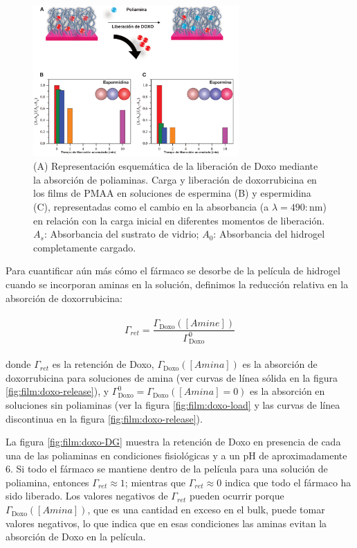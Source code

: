 \begin{figure}[!ht]
	\centering
	\includegraphics[width=0.7\textwidth]{Figures/graph-film/fig11.pdf}
	\caption{(A) Representaci\'on esquem\'atica de la liberaci\'on de Doxo mediante la absorci\'on de poliaminas. Carga y liberaci\'on de doxorrubicina en los films de PMAA en soluciones de espermina (B) y espermidina (C), representadas como el cambio en la absorbancia (a $\lambda=490:$nm) en relaci\'on con la carga inicial en diferentes momentos de liberaci\'on. $A_s$: Absorbancia del sustrato de vidrio; $A_0$: Absorbancia del hidrogel completamente cargado.}
	\label{fig:film:exp_doxo-amines}
\end{figure}

Para cuantificar a\'un m\'as c\'omo el f\'armaco se desorbe de la pel\'icula de hidrogel cuando se incorporan aminas en la soluci\'on, definimos la reducci\'on relativa en la absorci\'on de doxorrubicina:


\begin{align}
	\begin{aligned}
		\Gamma_{ret}= \dfrac{\Gamma_\text{Doxo}([Amine])}{\Gamma_\text{Doxo}^0}
	\end{aligned}
	\label{eq:film:doxo-DG}
\end{align}


\noindent donde $\Gamma_{ret}$ es la retenci\'on de Doxo, $\Gamma_\text{Doxo}([Amina])$ es la absorci\'on de doxorrubicina para soluciones de amina (ver curvas de l\'inea s\'olida en la figura \ref{fig:film:doxo-release}), y $\Gamma_\text{Doxo}^0=\Gamma_\text{Doxo}([Amina]=0)$ es la absorci\'on en soluciones sin poliaminas (ver la figura \ref{fig:film:doxo-load} y las curvas de línea discontinua en la figura \ref{fig:film:doxo-release}).

La figura \ref{fig:film:doxo-DG} muestra la retenci\'on de Doxo en presencia de cada una de las poliaminas en condiciones fisiol\'ogicas y a un pH de aproximadamente 6. Si todo el f\'armaco se mantiene dentro de la pel\'icula para una soluci\'on de poliamina, entonces $\Gamma_{ret}\approx 1$; mientras que $\Gamma_{ret}\approx 0$ indica que todo el f\'armaco ha sido liberado. Los valores negativos de $\Gamma_{ret}$ pueden ocurrir porque $\Gamma_\text{Doxo}([Amina])$, que es una cantidad en exceso en el bulk, puede tomar valores negativos, lo que indica que en esas condiciones las aminas evitan la absorci\'on de Doxo en la pel\'icula.

